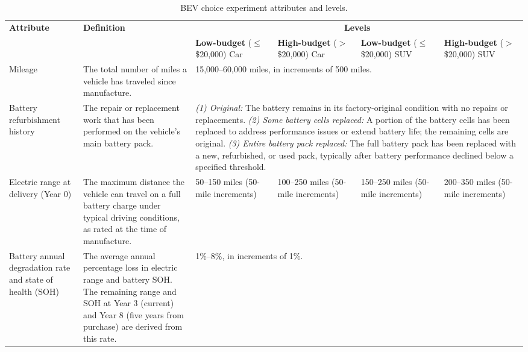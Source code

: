 \begin{table}[pos=H]
\caption{BEV choice experiment attributes and levels.}
\label{table:dce_attributes}
\begin{adjustbox}{width=\textwidth, center}
{\renewcommand{\arraystretch}{1.4}
\begin{tabular}{p{3.2cm} p{4.8cm} p{3cm} p{3cm} p{3cm} p{3cm}}
\toprule
\multirow{2}{*}{\textbf{Attribute}} & \multirow{2}{*}{\textbf{Definition}} & \multicolumn{4}{c}{\textbf{Levels}} \\
\cmidrule(lr){3-6}
 & & \textbf{Low-budget} \newline ($\leq$\$20,000) Car & \textbf{High-budget} \newline ($>$\$20,000) Car & \textbf{Low-budget} \newline ($\leq$\$20,000) SUV & \textbf{High-budget} \newline ($>$\$20,000) SUV \\
\midrule
Mileage & The total number of miles a vehicle has traveled since manufacture. & \multicolumn{4}{p{12.5cm}}{15,000--60,000 miles, in increments of 500 miles.} \\
\addlinespace[4pt]
Battery refurbishment history & The repair or replacement work that has been performed on the vehicle's main battery pack. & \multicolumn{4}{p{12.5cm}}{%
  \textit{(1) Original:} The battery remains in its factory-original condition with no repairs or replacements.\newline
  \textit{(2) Some battery cells replaced:} A portion of the battery cells has been replaced to address performance issues or extend battery life; the remaining cells are original.\newline
  \textit{(3) Entire battery pack replaced:} The full battery pack has been replaced with a new, refurbished, or used pack, typically after battery performance declined below a specified threshold.} \\
\addlinespace[4pt]
Electric range at delivery (Year 0) & The maximum distance the vehicle can travel on a full battery charge under typical driving conditions, as rated at the time of manufacture. & 50--150 miles \newline (50-mile increments) & 100--250 miles \newline (50-mile increments) & 150--250 miles \newline (50-mile increments) & 200--350 miles \newline (50-mile increments) \\
\addlinespace[4pt]
Battery annual degradation rate and state of health (SOH) & The average annual percentage loss in electric range and battery SOH. The remaining range and SOH at Year 3 (current) and Year 8 (five years from purchase) are derived from this rate. & \multicolumn{4}{p{12.5cm}}{1\%--8\%, in increments of 1\%.} \\

\end{tabular}}
\end{adjustbox}
\end{table}
